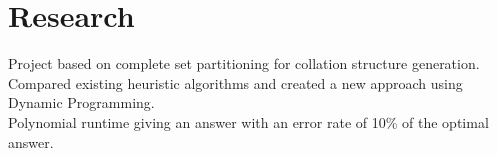 \documentclass[a4paper]{deedy-resume} %
\begin{document}
\begin{minipage}[t]{0.66\textwidth}
\sectionspace








\section{Research}


Project based on complete set partitioning for collation structure generation.\\
Compared existing heuristic algorithms and created a new approach using Dynamic Programming.\\
Polynomial runtime giving an answer with an error rate of 10\% of the optimal answer.

\sectionspace



\sectionspace



\end{minipage}
\end{document}
